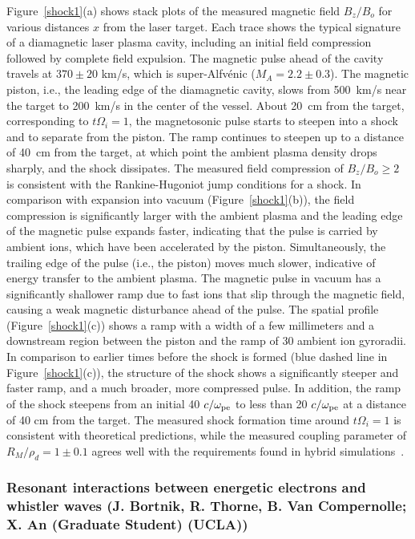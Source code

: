 \documentclass[11pt]{article}
\renewcommand{\cite}{\citep}
\begin{document}
Figure~\ref{shock1}(a) shows stack plots of the measured magnetic field
$B_z/B_o$ for various
distances $x$ from the laser target. Each trace shows the typical
signature of a diamagnetic laser plasma cavity, including an initial
field compression followed by complete field expulsion. The magnetic
pulse ahead of the cavity travels at $370 \pm 20$ km/s, which is
super-Alfvénic ($M_A = 2.2 \pm 0.3$). The magnetic
piston, i.e., the leading edge of the diamagnetic cavity, slows from
500~km/s near the target to 200~km/s in the center of the vessel. About 20~cm from the target, corresponding to
$t \Omega_{i} =1$, the magnetosonic pulse starts to
steepen into a shock and to separate from the piston. The ramp continues
to steepen up to a distance of 40~cm from the target, at which point the
ambient plasma density drops sharply, and the shock dissipates. The
measured field compression of $B_z/B_o \ge 2$ is consistent
with the Rankine-Hugoniot jump conditions for a shock. In comparison
with expansion into vacuum (Figure~\ref{shock1}(b)), the field compression is
significantly larger with the ambient plasma and the leading edge of the
magnetic pulse expands faster, indicating that the pulse is carried by
ambient ions, which have been accelerated by the piston. Simultaneously,
the trailing edge of the pulse (i.e., the piston) moves much slower,
indicative of energy transfer to the ambient plasma. The magnetic pulse
in vacuum has a significantly shallower ramp due to fast ions that slip
through the magnetic field, causing a weak magnetic disturbance ahead of
the pulse. The spatial profile (Figure~\ref{shock1}(c)) shows a ramp with a width of
a few millimeters and a downstream region between the piston and the
ramp of 30 ambient ion gyroradii. In comparison to earlier times before
the shock is formed (blue dashed line in Figure~\ref{shock1}(c)), the structure of
the shock shows a significantly steeper and faster ramp, and a much
broader, more compressed pulse. In addition, the ramp of the shock
steepens from an initial 40 $c/\omega_{\rm pe}$ to less
than 20 $c/\omega_{\rm pe}$ at a distance of 40 cm from
the target. The measured shock formation time around
$t \Omega_{i} = 1$ is consistent with theoretical
predictions, while the measured coupling parameter of
$R_M/\rho_d = 1 \pm 0.1$ agrees
well with the requirements found in hybrid simulations~\cite{clark:2014}.


\subsubsection{Resonant interactions between energetic electrons and whistler
waves (J. Bortnik, R. Thorne, B. Van Compernolle; X. An (Graduate
Student) (UCLA))}
\end{document}

